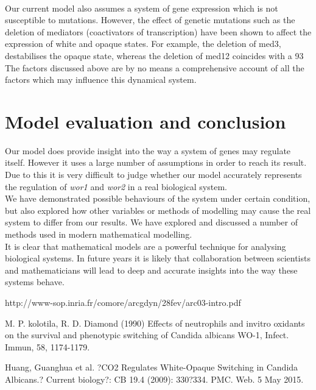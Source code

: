 \documentclass[]{article}
\begin{document}
\\
Our current model also assumes a system of gene expression which is not susceptible to mutations. However, the effect of genetic mutations such as the deletion of mediators (coactivators of transcription) have been shown to affect the expression of white and opaque states. For example, the deletion of med3, destabilises the opaque state, whereas the deletion of med12 coincides with a 93%
The factors discussed above are by no means a comprehensive account of all the factors which may influence this dynamical system.  %
\\
\section{Model evaluation and conclusion}
Our model does provide insight into the way a system of genes may regulate itself. However it uses a large number of assumptions in order to reach its result. Due to this it is very difficult to judge whether our model accurately represents the regulation of \textit{wor1} and \textit{wor2} in a real biological system.
\\
We have demonstrated possible behaviours of the system under certain condition, but also explored how other variables or methods of modelling may cause the real system to differ from our results. We have explored and discussed a number of methods used in modern mathematical modelling.
\\
It is clear that mathematical models are a powerful technique for analysing biological systems. In future years it is likely that collaboration between scientists and mathematicians will lead to deep and accurate insights into the way these systems behave.





http://www-sop.inria.fr/comore/arcgdyn/28fev/arc03-intro.pdf

M. P. kolotila, R. D. Diamond (1990) Effects of neutrophils and invitro oxidants on the survival and phenotypic switching of Candida albicans WO-1, Infect. Immun, 58, 1174-1179.

Huang, Guanghua et al. ?CO2 Regulates White-Opaque Switching in Candida Albicans.? Current biology?: CB 19.4 (2009): 330?334. PMC. Web. 5 May 2015.
\end{document}
